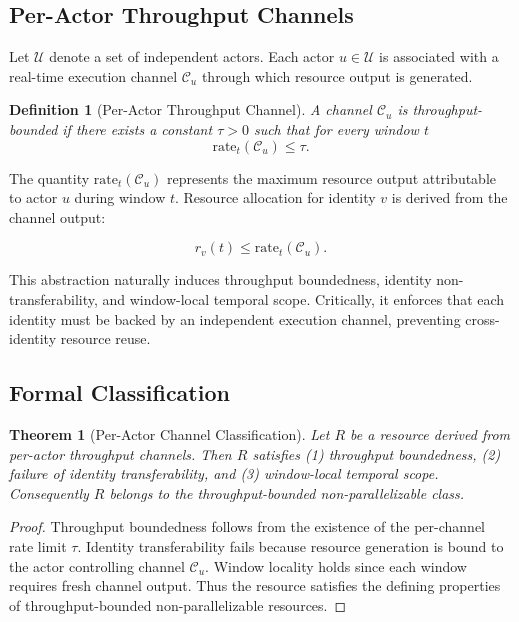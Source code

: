 \documentclass[journal]{IEEEtran}
\newtheorem{theorem}{Theorem}
\newtheorem{definition}{Definition}
\begin{document}
	\subsection{Per-Actor Throughput Channels}
	
	Let $\mathcal{U}$ denote a set of independent actors.
	Each actor $u \in \mathcal{U}$ is associated with a
	real-time execution channel $\mathcal{C}_u$ through which
	resource output is generated.
	
	\begin{definition}[Per-Actor Throughput Channel]
		A channel $\mathcal{C}_u$ is throughput-bounded if there exists
		a constant $\tau > 0$ such that for every window $t$
		\[
		\text{rate}_t(\mathcal{C}_u) \le \tau .
		\]
	\end{definition}
	
	The quantity $\text{rate}_t(\mathcal{C}_u)$ represents the maximum
	resource output attributable to actor $u$ during window $t$.
	Resource allocation for identity $v$ is derived from the channel output:
	
	\[
	r_v(t) \le \text{rate}_t(\mathcal{C}_u).
	\]
	
	This abstraction naturally induces throughput boundedness,
	identity non-transferability, and window-local temporal scope.
	Critically, it enforces that each identity must be backed by
	an independent execution channel, preventing cross-identity
	resource reuse.
	
	\subsection{Formal Classification}
	
	\begin{theorem}[Per-Actor Channel Classification]
		
		Let $R$ be a resource derived from per-actor throughput channels.
		Then $R$ satisfies (1) throughput boundedness,
		(2) failure of identity transferability,
		and (3) window-local temporal scope.
		Consequently $R$ belongs to the throughput-bounded
		non-parallelizable class.
		
	\end{theorem}
	
	\begin{proof}
		
		Throughput boundedness follows from the existence of the
		per-channel rate limit $\tau$.
		Identity transferability fails because resource generation
		is bound to the actor controlling channel $\mathcal{C}_u$.
		Window locality holds since each window requires fresh
		channel output. Thus the resource satisfies the defining
		properties of throughput-bounded non-parallelizable resources.
		
	\end{proof}
	
\end{document}
